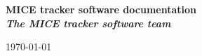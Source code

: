 \begin{figure}
  \vspace{2cm}
\end{figure}
\begin{center}
  {\bf\LARGE 
    MICE tracker software documentation                       \\
  }
  \vspace{0.75cm}
  {\bf\it\Large The MICE tracker software team} \\
  \vspace{2cm}
\end{center}

\vspace{3cm}

\begin{center}
  \vspace{3cm}
  \today{}
\end{center}

\vfill
